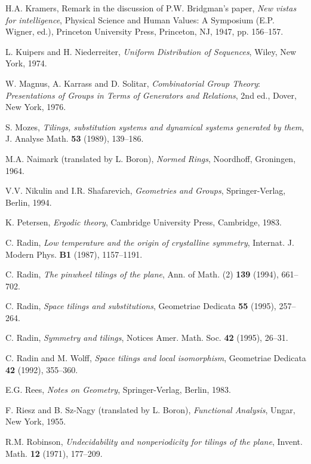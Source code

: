 \documentclass[reqno]{stml-l}
\theoremstyle{plain}
\theoremstyle{definition}
\numberwithin{equation}{chapter}
\begin{document}
\begin{thebibliography}{99}
 H.A. Kramers, Remark in the discussion of P.W. Bridgman's paper, \emph{New vistas for intelligence}, Physical Science and Human Values: A Symposium (E.P. Wigner, ed.), Princeton University Press, Princeton, NJ, 1947, pp. 156--157.

 L. Kuipers and H. Niederreiter, \emph{Uniform Distribution of Sequences}, Wiley, New York, 1974.

 W. Magnus, A. Karrass and D. Solitar, \emph{Combinatorial Group Theory}: \emph{Presentations of Groups in Terms of Generators and Relations}, 2nd ed., Dover, New York, 1976.

 S. Mozes, \emph{Tilings, substitution systems and dynamical systems generated by them}, J. Analyse Math. \textbf{53} (1989), 139--186.

 M.A. Naimark (translated by L. Boron), \emph{Normed Rings}, Noordhoff, Groningen, 1964.

 V.V. Nikulin and I.R. Shafarevich, \emph{Geometries and Groups}, Springer-Verlag, Berlin, 1994.

 K. Petersen, \emph{Ergodic theory}, Cambridge University Press, Cambridge, 1983.

 C. Radin, \emph{Low temperature and the origin of crystalline symmetry}, Internat. J. Modern Phys. \textbf{B1} (1987), 1157--1191.

 C. Radin, \emph{The pinwheel tilings of the plane}, Ann. of Math. (2) \textbf{139} (1994), 661--702.

 C. Radin, \emph{Space tilings and substitutions}, Geometriae Dedicata \textbf{55} (1995), 257--264.

 C. Radin, \emph{Symmetry and tilings}, Notices Amer. Math. Soc. \textbf{42} (1995), 26--31.

 C. Radin and M. Wolff, \emph{Space tilings and local isomorphism}, Geometriae Dedicata \textbf{42} (1992), 355--360.

 E.G. Rees, \emph{Notes on Geometry}, Springer-Verlag, Berlin, 1983.

 F. Riesz and B. Sz-Nagy (translated by L. Boron), \emph{Functional Analysis}, Ungar, New York, 1955.

 R.M. Robinson, \emph{Undecidability and nonperiodicity for tilings of the plane}, Invent. Math. \textbf{12} (1971), 177--209.


\end{thebibliography}
\end{document}
